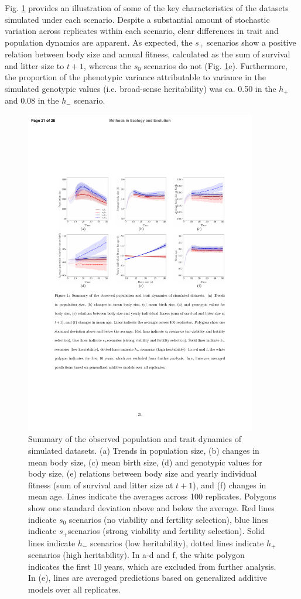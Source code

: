 Fig. \ref{simdata} provides an illustration of some of the key characteristics of the datasets simulated under each scenario. Despite a substantial amount of stochastic variation across replicates within each scenario, clear differences in trait and population dynamics are apparent. As expected, the $s_+$ scenarios show a positive relation between body size and annual fitness, calculated as the sum of survival and litter size to $t+1$, whereas the $s_0$ scenarios do not (Fig. \ref{simdata}e). Furthermore, the proportion of the phenotypic variance attributable to variance in the simulated genotypic values (i.e. broad-sense heritability) was ca. 0.50 in the $h_+$ and 0.08 in the $h_-$ scenario.
\newpage
\begin{figure}[H]
\includegraphics[width = 0.9\textwidth]{FiguresDecPop/fig1}
\caption{Summary of the observed population and trait dynamics of simulated datasets. (a) Trends in population size, (b) changes in mean body size, (c) mean birth size, (d) and genotypic values for body size, (e) relations between body size and yearly individual fitness (sum of survival and litter size at $t+1$), and (f) changes in mean age. Lines indicate the averages across 100 replicates. Polygons show one standard deviation above and below the average. Red lines indicate $s_0$ scenarios (no viability and fertility selection), blue lines indicate $s_+$scenarios (strong viability and fertility selection). Solid lines indicate $h_{-}$ scenarios (low heritability), dotted lines indicate $h_{+}$ scenarios (high heritability). In a-d and f, the white polygon indicates the first 10 years, which are excluded from further analysis. In (e), lines are averaged predictions based on generalized additive models over all replicates.}
\label{simdata}
\end{figure}

